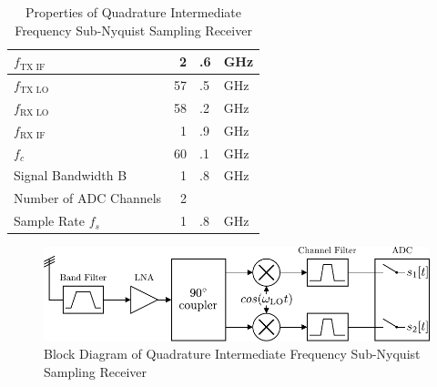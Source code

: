\begin{table}[h]
  \centering
  \begin{tabular}{|l|r@{}l@{~}l|}
    \hline
    $f_{\text{TX IF}}$ & 2&.6&GHz \\ \hline
    $f_{\text{TX LO}}$ & 57&.5&GHz \\ \hline
    $f_{\text{RX LO}}$ & 58&.2&GHz \\ \hline
    $f_{\text{RX IF}}$ & 1&.9&GHz \\ \hline
    $f_c$            & 60&.1&GHz \\ \hline
    Signal Bandwidth B & 1&.8&GHz \\ \hline
    Number of \gls{ADC} Channels & 2&& \\ \hline
    Sample Rate $f_s$ & 1&.8&GHz \\ \hline
  \end{tabular}
  \caption{Properties of Quadrature Intermediate Frequency
    Sub-Nyquist Sampling Receiver}
  \label{tab:rx_2}
\end{table}

\begin{figure}[h!]
  \centering
  \includegraphics[width=\textwidth]{figures/quad_if_rx_block_diagram}
  \caption{Block Diagram of Quadrature Intermediate Frequency Sub-Nyquist Sampling Receiver}
  \label{fig:rx_2_bd}
\end{figure}

